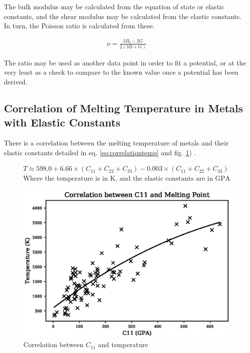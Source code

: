 The bulk modulus may be calculated from the equation of state or elastic constants, and the shear modulus may be calculated from the elastic constants.  In turn, the Poisson ratio is calculated from these.  

\begin{equation}
\begin{split}
\nu = \frac{3 B_0 - 2G}{2(3B+G)}
\end{split}
\label{eq:PoissonRatio2}
\end{equation}

The ratio may be used as another data point in order to fit a potential, or at the very least as a check to compare to the known value once a potential has been derived.


\FloatBarrier
\subsection{Correlation of Melting Temperature in Metals with Elastic Constants}

There is a correlation between the melting temperature of metals and their elastic constants detailed in eq. \ref{eq:correlationtemp} and fig. \ref{fig:c11correlation}) \cite{ElasticMeltingTemp}.  

\begin{equation}
\begin{split}
T \approx 598.0 + 6.66 \times (C_{11} + C_{22} + C_{33}) - 0.003 \times (C_{11} + C_{22} + C_{33}) \\
\text{Where the temperature is in K, and the elastic constants are in GPA}
\end{split}
\label{eq:correlationtemp}
\end{equation}

\begin{figure}[htbp]
  \begin{center}
    \includegraphics[scale=0.80]{chapters/background_potential_fitting/plots/c11_temperature}%
    \caption{Correlation between $C_{11}$ and temperature}
    \label{fig:c11correlation}
  \end{center}
\end{figure}

